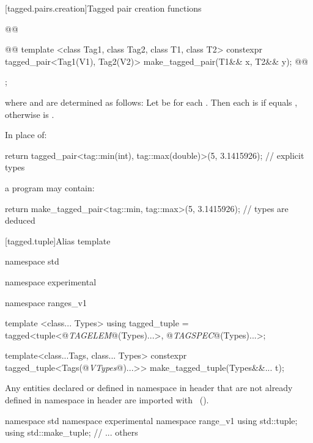 {[tagged.pairs.creation]{Tagged pair creation functions}

%
\begin{itemdecl}
@@

@@
  template <class Tag1, class Tag2, class T1, class T2>
    constexpr tagged_pair<Tag1(V1), Tag2(V2)> make_tagged_pair(T1&& x, T2&& y);
@\newtxt{\}\}\}}@
\end{itemdecl}

\begin{itemdescr}
\pnum
\returns {};

where  and  are determined as follows: Let  be
 for each . Then each  is 
if  equals , otherwise  is
.

\pnum
\enterexample
In place of:

\begin{codeblock}
  return tagged_pair<tag::min(int), tag::max(double)>(5, 3.1415926);   // explicit types
\end{codeblock}

a \Cpp program may contain:

\begin{codeblock}
  return make_tagged_pair<tag::min, tag::max>(5, 3.1415926);           // types are deduced
\end{codeblock}
\exitexample
\end{itemdescr}

{\color{newclr}
[tagged.tuple]{Alias template }


\begin{codeblock}
namespace std { namespace experimental { namespace ranges_v1 {
  template <class... Types>
  using tagged_tuple = tagged<tuple<@\textit{TAGELEM}@(Types)...>,
                              @\textit{TAGSPEC}@(Types)...>;

  template<class...Tags, class... Types>
    constexpr tagged_tuple<Tags(@\textit{VTypes}@)...>> make_tagged_tuple(Types&&... t);
}}}
\end{codeblock}

\pnum
Any entities declared or defined in namespace  in header 
that are not already defined in namespace  in header
 are imported with
~(). \enterexample
\begin{codeblock}
namespace std { namespace experimental { namespace range_v1 {
  using std::tuple;
  using std::make_tuple;
  // ... others
}}}
\end{codeblock}
\exitexample
}

}
